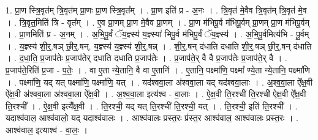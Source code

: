 \documentclass[17pt]{extarticle}
\begin{document}
1. प्रा॒ण स्त्रि॒वृत॑म् त्रि॒वृत॑म् प्रा॒णः प्रा॒ण स्त्रि॒वृत᳚म् । . प्रा॒ण इति॑ प्र - अ॒नः । . त्रि॒वृत॑ मे॒वैव त्रि॒वृत॑म् त्रि॒वृत॑ मे॒व । . त्रि॒वृत॒मिति॑ त्रि - वृत᳚म् । . ए॒व प्रा॒णम् प्रा॒ण मे॒वैव प्रा॒णम् । . प्रा॒ण म॑भिपू॒र्व म॑भिपू॒र्वम् प्रा॒णम् प्रा॒ण म॑भिपू॒र्वम् । . प्रा॒णमिति॑ प्र - अ॒नम् । . अ॒भि॒पू॒र्वं ॅय॒ज्ञ्स्य॑ य॒ज्ञ्स्या॑ भिपू॒र्व म॑भिपू॒र्वं ॅय॒ज्ञ्स्य॑ । . अ॒भि॒पू॒र्वमित्य॑भि - पू॒र्वम् । . य॒ज्ञ्स्य॑ शी॒र्॒.षञ् छी॒र्॒.षन्. य॒ज्ञ्स्य॑ य॒ज्ञ्स्य॑ शी॒र्॒.षन्न् । . शी॒र्॒.षन् द॑धाति दधाति शी॒र्॒.षञ् छी॒र्॒.षन् द॑धाति । . द॒धा॒ति॒ प्र॒जाप॑तेः प्र॒जाप॑तेर् दधाति दधाति प्र॒जाप॑तेः । . प्र॒जाप॑ते॒र् वै वै प्र॒जाप॑तेः प्र॒जाप॑ते॒र् वै । . प्र॒जाप॑ते॒रिति॑ प्र॒जा - प॒तेः॒ । . वा ए॒ता न्ये॒तानि॒ वै वा ए॒तानि॑ । . ए॒तानि॒ पक्ष्मा॑णि॒ पक्ष्मा᳚ ण्ये॒ता न्ये॒तानि॒ पक्ष्मा॑णि । . पक्ष्मा॑णि॒ यद् यत् पक्ष्मा॑णि॒ पक्ष्मा॑णि॒ यत् । . यद॑श्ववा॒ला अ॑श्ववा॒ला यद् यद॑श्ववा॒लाः । . अ॒श्व॒वा॒ला ऐ᳚क्ष॒वी ऐ᳚क्ष॒वी अ॑श्ववा॒ला अ॑श्ववा॒ला ऐ᳚क्ष॒वी । . अ॒श्व॒वा॒ला इत्य॑श्व - वा॒लाः । . ऐ॒क्ष॒वी ति॒रश्ची॑ ति॒रश्ची॑ ऐक्ष॒वी ऐ᳚क्ष॒वी ति॒रश्ची᳚ । . ऐ॒क्ष॒वी इत्यै᳚क्ष॒वी । . ति॒रश्ची॒ यद् यत् ति॒रश्ची॑ ति॒रश्ची॒ यत् । . ति॒रश्ची॒ इति॑ ति॒रश्ची᳚ । . यदाश्व॑वाल॒ आश्व॑वालो॒ यद् यदाश्व॑वालः । . आश्व॑वालः प्रस्त॒रः प्र॑स्त॒र आश्व॑वाल॒ आश्व॑वालः प्रस्त॒रः । . आश्व॑वाल॒ इत्याश्व॑ - वा॒लः॒ । \newline
\end{document}
